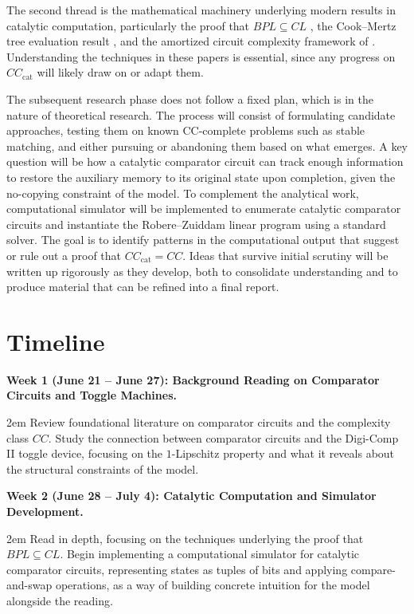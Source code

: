 \documentclass[12pt]{article}
\newcommand{\CCC}{CC_\text{cat}}
\begin{document}
The second thread is the mathematical machinery underlying modern results in catalytic computation, particularly the proof that $BPL \subseteq CL$ 
\autocite{BuhrmanEtAl2014}, the Cook--Mertz tree evaluation result 
\textcite{CookMertz2024}, and the amortized circuit complexity framework of  \textcite{RobreZuiddam2021}. Understanding the techniques 
in these papers is essential, since any progress on $\CCC$ will likely draw on or adapt them.

The subsequent research phase does not follow a fixed plan, which is in the nature of theoretical research. The process will consist of formulating candidate approaches, testing them on known CC-complete problems such as stable matching, and either pursuing or abandoning them based on what emerges. A key question will be how a catalytic comparator circuit can track enough information to restore the auxiliary memory to its original state upon completion, given the no-copying constraint of the model. To complement the analytical work, computational simulator will be implemented to enumerate catalytic comparator circuits and instantiate the Robere--Zuiddam linear program using a standard solver. The goal is to identify patterns in the computational output that suggest or rule out a proof that $\CCC = CC$. Ideas that survive initial scrutiny will be written up rigorously as they develop, both to consolidate understanding and to produce material that can be refined into a final report.


\newpage 
\printbibliography

\newpage 


\section{Timeline}

\textbf{Week 1 (June 21 -- June 27): Background Reading on Comparator Circuits and Toggle Machines.}

    \begin{adjustwidth}{2em}{}
        Review foundational literature on comparator circuits and the complexity class $CC$. Study the connection between comparator circuits and the Digi-Comp II toggle device, focusing on the $1$-Lipschitz property and what it reveals about the structural constraints of the model.
    \end{adjustwidth}

\textbf{Week 2 (June 28 -- July 4): Catalytic Computation and Simulator Development.}
    
    \begin{adjustwidth}{2em}{}
        Read \textcite{BuhrmanEtAl2014} in depth, focusing on the techniques underlying the proof that $BPL \subseteq CL$. Begin implementing a computational simulator for catalytic comparator circuits, representing states as tuples of bits and applying compare-and-swap operations, as a way of building concrete intuition for the model alongside the reading.
    \end{adjustwidth}
\end{document}
